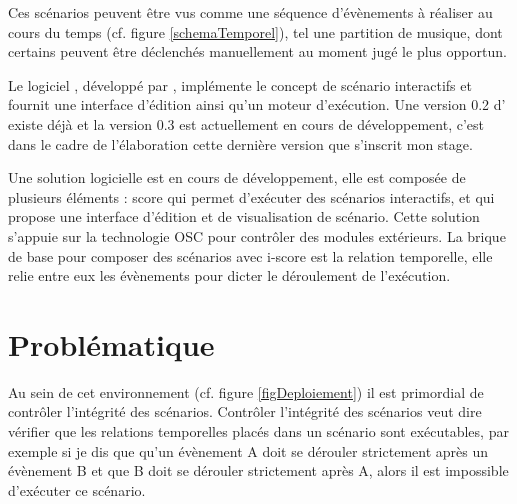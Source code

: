
Ces scénarios peuvent être vus comme une séquence d'évènements à réaliser au cours du temps (cf. figure \ref{schemaTemporel}), tel une partition de musique, dont certains peuvent être déclenchés manuellement au moment jugé le plus opportun.


Le logiciel \iscore{}, développé par \ossia{}, implémente le concept de scénario interactifs et fournit une interface d'édition ainsi qu'un moteur d'exécution. Une version 0.2 d'\iscore{} existe déjà et la version 0.3 est actuellement en cours de développement, c'est dans le cadre de l'élaboration cette dernière version que s'inscrit mon stage. 



Une solution logicielle est en cours de développement, elle est composée de plusieurs éléments : score qui permet d'exécuter des scénarios interactifs, et \iscore{} qui propose une interface d'édition et de visualisation de scénario. Cette solution s'appuie sur la technologie OSC pour contrôler des modules extérieurs. La brique de base pour composer des scénarios avec i-score est la relation temporelle, elle relie entre eux les évènements pour dicter le déroulement de l'exécution.



\section*{Problématique}

Au sein de cet environnement (cf. figure \ref{figDeploiement}) il est primordial de contrôler l'intégrité des scénarios. Contrôler l'intégrité des scénarios veut dire vérifier que les relations temporelles placés dans un scénario sont exécutables, par exemple si je dis que qu'un évènement A doit se dérouler strictement après un évènement B et que B doit se dérouler strictement après A, alors il est impossible d'exécuter ce scénario.

